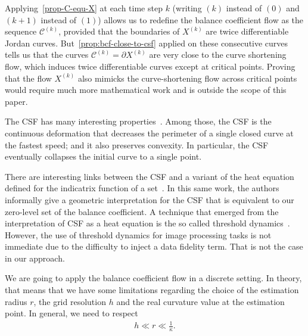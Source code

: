 \documentclass[review]{siamart220329}
\newcommand{\C}{\mathcal{C}} %
\begin{document}
Applying~\cref{prop-C-equ-X} at each time step $k$ (writing
$(k)$ instead of $(0)$ and $(k+1)$ instead of $(1)$) allows us to
redefine the balance coefficient flow as the sequence $\C^{(k)}$,
provided that the boundaries of $X^{(k)}$ are twice differentiable
Jordan curves. But~\cref{prop:bcf-close-to-csf} applied on
these consecutive curves tells us that the curves $\C^{(k)}=\partial
X^{(k)}$ are very close to the curve shortening flow, which induces
twice differentiable curves except at critical points. Proving that
the flow $X^{(k)}$ also mimicks the curve-shortening flow across
critical points would require much more mathematical work and is
outside the scope of this paper.

The CSF has many interesting
properties~\cite{huisken84flow,gage86heat,ecker2008heat}. Among those, the CSF
is the continuous deformation that decreases the perimeter of a single closed
curve at the fastest speed; and it also preserves convexity. In particular, the
CSF eventually collapses the initial curve to a single point.

There are interesting links between the CSF and a variant of the heat equation
defined for the indicatrix function of a set~\cite{merriman1992diffusion}. In
this same work, the authors informally give a geometric interpretation for the
CSF that is equivalent to our zero-level set of the balance coefficient. A
technique that emerged from the interpretation of CSF as a heat equation is the
so called threshold dynamics~\cite{esedoglu2005threshold,esedoglu2008threshold}.
However, the use of threshold dynamics for image processing tasks is not
immediate due to the difficulty to inject a data fidelity term. That is not the
case in our approach.

We are going to apply the balance coefficient flow in a discrete setting. In
theory, that means that we have some limitations regarding the choice of the
estimation radius $r$, the grid resolution $h$ and the real curvature value at
the estimation point. In general, we need to respect
%
%
\begin{align*}
	h \ll r \ll \frac{1}{\kappa}.
\end{align*}
%
%


%
%
%
%
%
%
%
%
\end{document}
